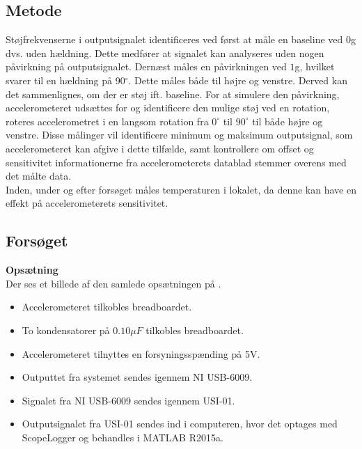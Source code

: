 \subsection{Metode}
Støjfrekvenserne i outputsignalet identificeres ved først at måle en baseline ved $0$g dvs. uden hældning. Dette medfører at signalet kan analyseres uden nogen påvirkning på outputsignalet. Dernæst måles en påvirkningen ved $1$g, hvilket svarer til en hældning på 90$^{\circ}$. Dette måles både til højre og venstre. Derved kan det sammenlignes, om der er støj ift. baseline. %
For at simulere den påvirkning, accelerometeret udsættes for og identificere den mulige støj ved en rotation, roteres accelerometret i en langsom rotation fra $0^{\circ}$ til $90^{\circ}$ til både højre og venstre. Disse målinger vil identificere minimum og maksimum outputsignal, som accelerometeret kan afgive i dette tilfælde, samt kontrollere om offset og sensitivitet informationerne fra accelerometerets datablad stemmer overens med det målte data. \\
Inden, under og efter forsøget måles temperaturen i lokalet, da denne kan have en effekt på accelerometerets sensitivitet. \cite{Devices2009}

\subsection{Forsøget}
\textbf{Opsætning}\\
Der ses et billede af den samlede opsætningen på .
\begin{itemize}
\item Accelerometeret tilkobles breadboardet.
\item To kondensatorer på $0.10 \mu F$ tilkobles breadboardet. 
\item Accelerometeret tilnyttes en forsyningsspænding på 5V.
\item Outputtet fra systemet sendes igennem NI USB-6009.
\item Signalet fra NI USB-6009 sendes igennem USI-01. 
\item Outputsignalet fra USI-01 sendes ind i computeren, hvor det optages med ScopeLogger og behandles i MATLAB R2015a.
\end{itemize}


